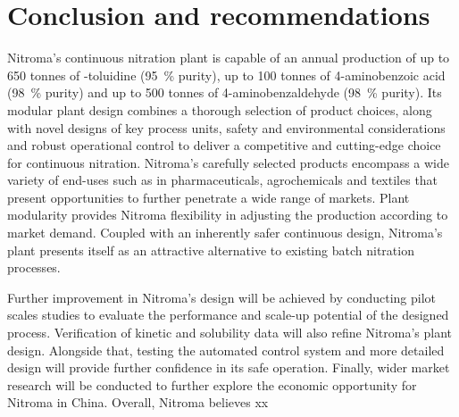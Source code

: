 \section*{Conclusion and recommendations}
Nitroma's continuous nitration plant is capable of an annual production of up to 650 tonnes of \ortho-toluidine (\SI{95}{\percent} purity), up to 100 tonnes of 4-aminobenzoic acid (\SI{98}{\percent} purity) and up to 500 tonnes of 4-aminobenzaldehyde (\SI{98}{\percent} purity). Its modular plant design combines a thorough selection of product choices, along with novel designs of key process units, safety and environmental considerations and robust operational control to deliver a competitive and cutting-edge choice for continuous nitration. Nitroma's carefully selected products encompass a wide variety of end-uses such as in pharmaceuticals, agrochemicals and textiles that present opportunities to further penetrate a wide range of markets. Plant modularity provides Nitroma flexibility in adjusting the production according to market demand. Coupled with an inherently safer continuous design, Nitroma's plant presents itself as an attractive alternative to existing batch nitration processes.

Further improvement in Nitroma's design will be achieved by conducting pilot scales studies to evaluate the performance and scale-up potential of the designed process. Verification of kinetic and solubility data will also refine Nitroma's plant design. Alongside that, testing the automated control system and more detailed design will provide further confidence in its safe operation. Finally, wider market research will be conducted to further explore the economic opportunity for Nitroma in China. Overall, Nitroma believes xx

